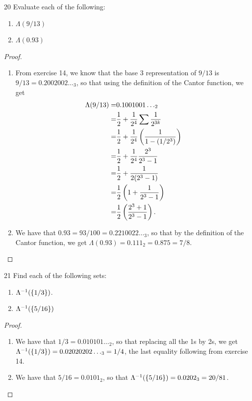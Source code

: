 \begin{exercise}{20}
Evaluate each of the following:
\begin{enumerate}
    \item $\Lambda(9/13)$
    \item $\Lambda(0.93)$
\end{enumerate}
\end{exercise}
\begin{proof}
\begin{enumerate}
    \item From exercise 14, we know that the base 3 representation of $9/13$ is $9/13 = 0.2002002\dots_3$, so that using the definition of the Cantor function, we get 
    \begin{align*}
        \Lambda(9/13) 
        =& 0.1001001\dots_2\\
        =& \frac{1}{2} + \frac{1}{2^4} \sum \frac{1}{2^{3k}}\\
        =& \frac{1}{2} + \frac{1}{2^4} \left( \frac{1}{1-(1/2^3)}\right)\\
        =& \frac{1}{2} + \frac{1}{2^4} \frac{2^3}{2^3-1}\\
        =& \frac{1}{2} + \frac{1}{2(2^3-1)}\\
        =& \frac{1}{2}\left( 1 + \frac{1}{2^3-1}\right)\\
        =& \frac{1}{2}\left( \frac{2^3 + 1}{2^3-1}\right).
    \end{align*}
    \item We have that $0.93 = 93/100 = 0.2210022\dots_3$, so that by the definition of the Cantor function, we get $\Lambda(0.93) = 0.111_2 = 0.875 = 7/8$.
\end{enumerate}
\end{proof} 

\begin{exercise}{21}
Find each of the following sets:
\begin{enumerate}
    \item $\Lambda^{-1}(\{1/3\})$.
    \item $\Lambda^{-1}(\{5/16\})$
\end{enumerate}
\end{exercise}
\begin{proof}
\begin{enumerate}
    \item We have that $1/3 = 0.010101\dots_2$, so that replacing all the 1s by 2s, we get $\Lambda^{-1}(\{1/3\}) = 0.02020202\dots_3 = 1/4$, the last equality following from exercise 14.
    \item We have that $5/16 = 0.0101_2$, so that $\Lambda^{-1}(\{5/16\}) = 0.0202_3 = 20/81$.
\end{enumerate}
\end{proof}
